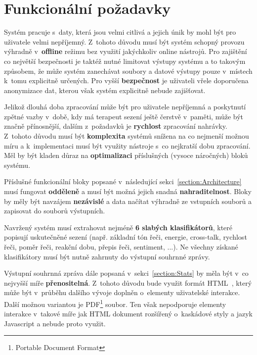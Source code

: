 
\section{Funkcionální požadavky}
\label{section:Requirements}
Systém pracuje s~daty, která jsou velmi citlivá a jejich únik by mohl být pro uživatele velmi nepříjemný. Z~tohoto důvodu musí být systém schopný provozu výhradně v~\textbf{offline} režimu bez využití jakýchkoliv online nástrojů. Pro zajištění co největší bezpečnosti je taktéž nutné limitovat výstupy systému a to takovým způsobem, že může systém zanechávat soubory a datové výstupy pouze v~místech k~tomu explicitně určených. Pro vyšší \textbf{bezpečnost} je uživateli vřele doporučena anonymizace dat, kterou však systém explicitně nebude zajišťovat.

Jelikož dlouhá doba zpracování může být pro uživatele nepříjemná a poskytnutí zpětné vazby v~době, kdy má terapeut sezení ještě čerstvě v~paměti, může být značně přínosnější, dalším z~požadavků je \textbf{rychlost} zpracování nahrávky. Z~tohoto důvodu musí být \textbf{komplexita} systémů snížena na co nejmenší možnou míru a k~implementaci musí být využity nástroje s~co nejkratší dobu zpracování. Měl by být kladen důraz na \textbf{optimalizaci} příslušných (vysoce náročných) bloků systému.

Příslušné funkcionální bloky popsané v~následující sekci~\ref{section:Architecture} musí fungovat \textbf{odděleně} a musí být možná jejich snadná \textbf{nahraditelnost}. Bloky by měly být navzájem \textbf{nezávislé} a data načítat výhradně ze vstupních souborů a zapisovat do souborů výstupních.

Navržený systém musí extrahovat nejméně \textbf{6 slabých klasifikátorů}, které popisují uskutečněné sezení (např. základní tón řeči, energie, cross-talk, rychlost řeči, poměr řeči, reakční dobu, přepis řeči, sentiment, ...). Ne všechny získané klasifikátory musí být nutně zahrnuty do výstupní souhrnné zprávy.

Výstupní souhrnná zpráva dále popsaná v~sekci~\ref{section:Stats} by měla být v~co nejvyšší míře \textbf{přenositelná}. Z~tohoto důvodu bude využit formát HTML~\cite{Html}, který může být v~průběhu dalšího vývoje doplněn o~elementy uživatelské interakce. Další možnou variantou je PDF\footnote{Portable Document Format} soubor. Ten však nepodporuje elementy interakce v~takové míře jak HTML dokument rozšířený o~kaskádové styly a jazyk Javascript\cite{js} a nebude proto využit.

